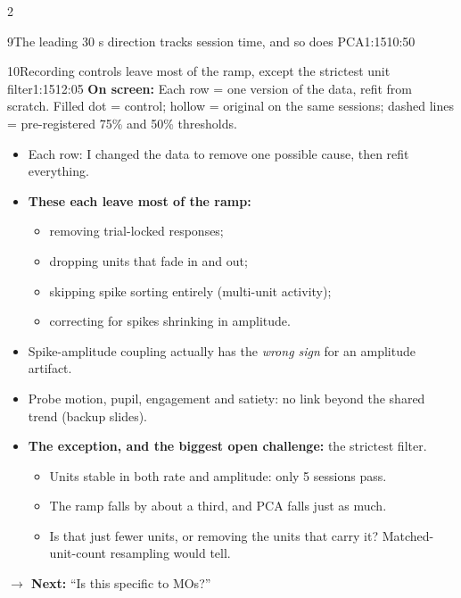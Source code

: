 \documentclass[10pt]{article}
\newcommand{\point}[1]{{\color{ink}\textbf{On screen:} #1}\par}
\newcommand{\bridge}[1]{\par{\color{accent}\textbf{$\rightarrow$ Next:} #1}\par}
\begin{document}
\begin{multicols}{2}
\begin{slidebox}{9}{The leading 30 s direction tracks session time, and so does PCA}{1:15}{10:50}
\end{slidebox}
\begin{slidebox}{10}{Recording controls leave most of the ramp, except the strictest unit filter}{1:15}{12:05}
\point{Each row = one version of the data, refit from scratch. Filled dot = control; hollow = original on the same
sessions; dashed lines = pre-registered 75\% and 50\% thresholds.}
\begin{itemize}
\item Each row: I changed the data to remove one possible cause, then refit everything.
\item \textbf{These each leave most of the ramp:}
  \begin{itemize}
  \item removing trial-locked responses;
  \item dropping units that fade in and out;
  \item skipping spike sorting entirely (multi-unit activity);
  \item correcting for spikes shrinking in amplitude.
  \end{itemize}
\item Spike-amplitude coupling actually has the \emph{wrong sign} for an amplitude artifact.
\item Probe motion, pupil, engagement and satiety: no link beyond the shared trend (backup slides).
\item \textbf{The exception, and the biggest open challenge:} the strictest filter.
  \begin{itemize}
  \item Units stable in both rate and amplitude: only 5 sessions pass.
  \item The ramp falls by about a third, and PCA falls just as much.
  \item Is that just fewer units, or removing the units that carry it? Matched-unit-count resampling would tell.
  \end{itemize}
\end{itemize}
\bridge{``Is this specific to MOs?''}


\end{slidebox}
\end{multicols}
\end{document}
